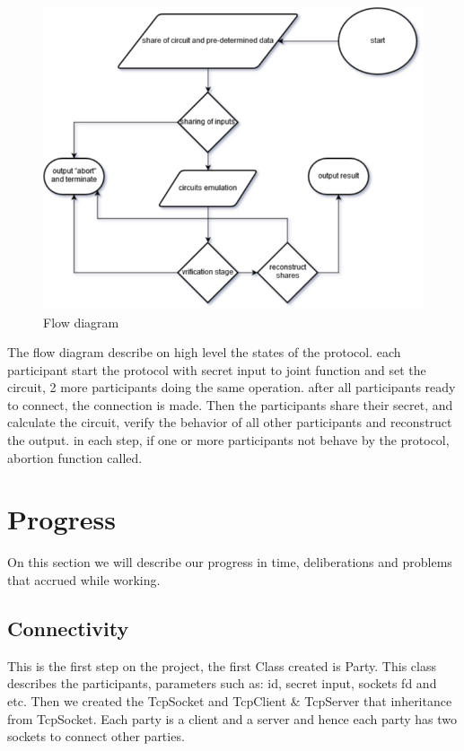 \documentclass[12pt]{article}
\begin{document}
\hfill\break\hfill\break
\begin{figure}[h]
	\centering
	\includegraphics[width=0.9\linewidth]{"../Figures/High-level flow chart"}
	\caption{Flow diagram}
	\label{fig:high-level-flow-chart}
\end{figure}

The flow diagram describe on high level the states of the protocol.
each participant start the protocol with secret input to joint function and set the circuit, 2 more participants doing the same operation. after all participants ready to connect, the connection is made. Then the participants share their secret, and calculate the circuit, verify the behavior of all other participants and reconstruct the output. in each step, if one or more participants not behave by the protocol, abortion function called.


\pagebreak
\section{Progress}
On this section we will describe our progress in time, deliberations and problems that accrued while working.


\subsection{Connectivity}
This is the first step on the project, the first Class created is Party. This class describes the participants, parameters such as: id, secret input, sockets fd and etc.
Then we created the TcpSocket and TcpClient \& TcpServer that inheritance from TcpSocket. Each party is a client and a server and hence each party has two sockets to connect other parties.
\end{document}
